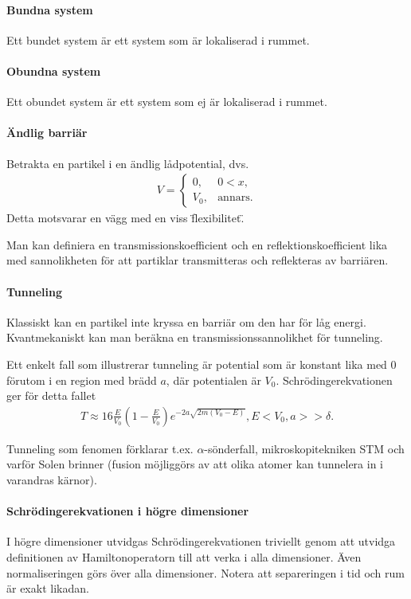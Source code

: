 \paragraph{Bundna system}
Ett bundet system är ett system som är lokaliserad i rummet.

\paragraph{Obundna system}
Ett obundet system är ett system som ej är lokaliserad i rummet.

\paragraph{Ändlig barriär}
Betrakta en partikel i en ändlig lådpotential, dvs.
\begin{align*}
	V = 
	\begin{cases}
		0,      &0 < x, \\
		V_{0},  &\text{annars.}
	\end{cases}
\end{align*}
Detta motsvarar en vägg med en viss \"flexibilitet\".

Man kan definiera en transmissionskoefficient och en reflektionskoefficient lika med sannolikheten för att partiklar transmitteras och reflekteras av barriären.

\paragraph{Tunneling}
Klassiskt kan en partikel inte kryssa en barriär om den har för låg energi. Kvantmekaniskt kan man beräkna en transmissionssannolikhet för tunneling.

Ett enkelt fall som illustrerar tunneling är potential som är konstant lika med $0$ förutom i en region med brädd $a$, där potentialen är $V_{0}$. Schrödingerekvationen ger för detta fallet
\begin{align*}
	T \approx 16\frac{E}{V_{0}}\left(1 - \frac{E}{V_{0}}\right)e^{-2a\sqrt{2m(V_{0} - E)}}, E < V_{0}, a >> \delta.
\end{align*}

Tunneling som fenomen förklarar t.ex. $\alpha$-sönderfall, mikroskopitekniken STM och varför Solen brinner (fusion möjliggörs av att olika atomer kan tunnelera in i varandras kärnor).

\paragraph{Schrödingerekvationen i högre dimensioner}
I högre dimensioner utvidgas Schrödingerekvationen triviellt genom att utvidga definitionen av Hamiltonoperatorn till att verka i alla dimensioner. Även normaliseringen görs över alla dimensioner. Notera att separeringen i tid och rum är exakt likadan.

